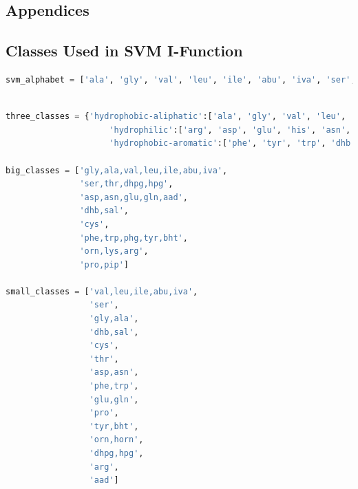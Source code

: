 \documentclass{l4proj}
\begin{document}
%
% 

\begin{appendices}

\chapter{Appendices}

\section{Classes Used in SVM I-Function} \label{svmclasses}

\begin{lstlisting}[language=python, float, caption={Alphabet used for SVM I-Function.}, label=lst:svmalphabet]
svm_alphabet = ['ala', 'gly', 'val', 'leu', 'ile', 'abu', 'iva', 'ser', 'thr', 'hpg', 'dhpg', 'cys', 'pro', 'pip', 'arg', 'asp', 'glu', 'his', 'asn', 'lys', 'gln', 'orn', 'aad', 'phe', 'tyr', 'trp', 'dhb', 'phg', 'bht']
\end{lstlisting}

\begin{lstlisting}[language=python, float, caption={Classes used for SVM-I Function. Any exact match evaluates to 1.0. A small-class match evaluates to 0.75, a large-class match evaluates to 0.5, a three-class match evaluates to 0.25, and it evaluates to 0 otherwise.}, label=lst:svmclasses]
		
three_classes = {'hydrophobic-aliphatic':['ala', 'gly', 'val', 'leu', 'ile', 'abu', 'iva', 'ser', 'thr', 'hpg', 'dhpg', 'cys', 'pro', 'pip'],
                 	 'hydrophilic':['arg', 'asp', 'glu', 'his', 'asn', 'lys', 'gln', 'orn', 'aad'],
                 	 'hydrophobic-aromatic':['phe', 'tyr', 'trp', 'dhb', 'phg', 'bht']}

big_classes = ['gly,ala,val,leu,ile,abu,iva',
			   'ser,thr,dhpg,hpg', 
			   'asp,asn,glu,gln,aad', 
			   'dhb,sal', 
			   'cys', 
			   'phe,trp,phg,tyr,bht', 
			   'orn,lys,arg', 
			   'pro,pip']

small_classes = ['val,leu,ile,abu,iva', 
				 'ser', 
				 'gly,ala', 
				 'dhb,sal', 
				 'cys', 
				 'thr', 
				 'asp,asn', 
				 'phe,trp', 
				 'glu,gln', 
				 'pro', 
				 'tyr,bht', 
				 'orn,horn', 
				 'dhpg,hpg', 
				 'arg', 
				 'aad']
\end{lstlisting}

\end{appendices}







\listoffigures

\end{document}
